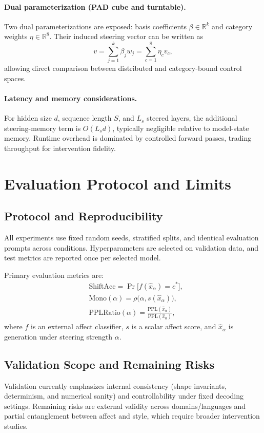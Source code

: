 \paragraph{Dual parameterization (PAD cube and turntable).}
\label{sec:dev:serving:ui}
Two dual parameterizations are exposed: basis coefficients
$\beta\in\mathbb{R}^{k}$ and category weights
$\eta\in\mathbb{R}^{8}$. Their induced steering vector can be written as
\begin{equation}
  v=\sum_{j=1}^{k}\beta_jw_j=\sum_{c=1}^{8}\eta_cv_c,
\end{equation}
allowing direct comparison between distributed and category-bound
control spaces.

\paragraph{Latency and memory considerations.}
\label{sec:dev:serving:latency}
For hidden size $d$, sequence length $S$, and $L_s$ steered layers, the
additional steering-memory term is $O(L_s d)$, typically negligible
relative to model-state memory. Runtime overhead is dominated by
controlled forward passes, trading throughput for intervention fidelity.

\section{Evaluation Protocol and Limits}
\label{sec:dev:practice}

\subsection{Protocol and Reproducibility}
\label{sec:dev:practice:cfg}
All experiments use fixed random seeds, stratified splits, and identical
evaluation prompts across conditions. Hyperparameters are selected on
validation data, and test metrics are reported once per selected model.

Primary evaluation metrics are:
\begin{align}
  &\text{ShiftAcc}=\Pr\bigl[f(\hat{x}_{\alpha})=c^*\bigr],\\
  &\text{Mono}(\alpha)=\rho\bigl(\alpha,s(\hat{x}_{\alpha})\bigr),\\
  &\text{PPLRatio}(\alpha)=
    \frac{\mathrm{PPL}(\hat{x}_{\alpha})}{\mathrm{PPL}(\hat{x}_{0})},
\end{align}
where $f$ is an external affect classifier,
$s$ is a scalar affect score, and
$\hat{x}_{\alpha}$ is generation under steering strength $\alpha$.

\subsection{Validation Scope and Remaining Risks}
\label{sec:dev:practice:tests}
Validation currently emphasizes internal consistency (shape invariants,
determinism, and numerical sanity) and controllability under fixed
decoding settings. Remaining risks are external validity across
domains/languages and partial entanglement between affect and style,
which require broader intervention studies.